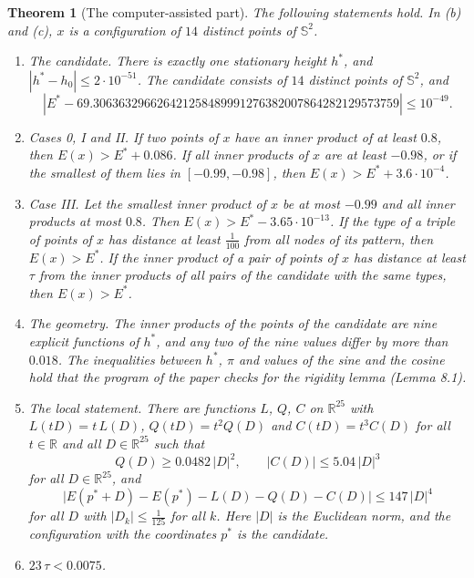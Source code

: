 \documentclass[reqno,a4paper,11pt]{amsart}
\newtheorem{theorem}{Theorem}
\newcommand{\R}{\mathbb{R}}
\newcommand{\Sph}{\mathbb{S}}
\begin{document}
\begin{theorem}[The computer-assisted part]\label{thm:cap}
The following statements hold. In (b) and (c), $x$ is a configuration of $14$ distinct points of $\Sph^2$.
\begin{enumerate}
    \item[(a)] \emph{The candidate.} There is exactly one stationary height $h^*$, and $|h^* - h_0| \leq 2 \cdot 10^{-51}$. The candidate consists of $14$ distinct points of $\Sph^2$, and
    \[
        |E^* - 69.306363296626421258489991276382007864282129573759| \leq 10^{-49} .
    \]
    \item[(b)] \emph{Cases 0, I and II.} If two points of $x$ have an inner product of at least $0.8$, then $E(x) > E^* + 0.086$. If all inner products of $x$ are at least $-0.98$, or if the smallest of them lies in $[-0.99, -0.98]$, then $E(x) > E^* + 3.6 \cdot 10^{-4}$.
    \item[(c)] \emph{Case III.} Let the smallest inner product of $x$ be at most $-0.99$ and all inner products at most $0.8$. Then $E(x) > E^* - 3.65 \cdot 10^{-13}$. If the type of a triple of points of $x$ has distance at least $\frac{1}{100}$ from all nodes of its pattern, then $E(x) > E^*$. If the inner product of a pair of points of $x$ has distance at least $\tau$ from the inner products of all pairs of the candidate with the same types, then $E(x) > E^*$.
    \item[(d)] \emph{The geometry.} The inner products of the points of the candidate are nine explicit functions of $h^*$, and any two of the nine values differ by more than $0.018$. The inequalities between $h^*$, $\pi$ and values of the sine and the cosine hold that the program of the paper checks for the rigidity lemma (Lemma 8.1).
    \item[(e)] \emph{The local statement.} There are functions $L$, $Q$, $C$ on $\R^{25}$ with $L(tD) = t \, L(D)$, $Q(tD) = t^2 Q(D)$ and $C(tD) = t^3 C(D)$ for all $t \in \R$ and all $D \in \R^{25}$ such that
    \[
        Q(D) \geq 0.0482 \, |D|^2 , \qquad |C(D)| \leq 5.04 \, |D|^3
    \]
    for all $D \in \R^{25}$, and
    \[
        \bigl| E(p^* + D) - E(p^*) - L(D) - Q(D) - C(D) \bigr| \leq 147 \, |D|^4
    \]
    for all $D$ with $|D_k| \leq \frac{1}{125}$ for all $k$. Here $|D|$ is the Euclidean norm, and the configuration with the coordinates $p^*$ is the candidate.
    \item[(f)] $23 \, \tau < 0.0075$.
\end{enumerate}
\end{theorem}
\end{document}
